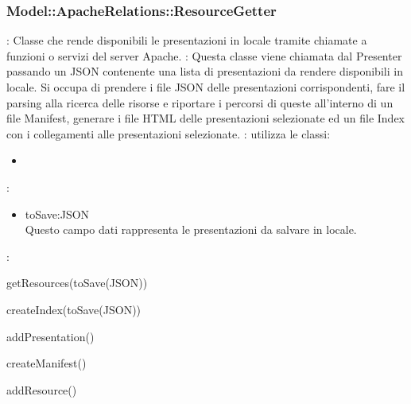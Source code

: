 \subsubsection{Model::ApacheRelations::ResourceGetter}{
	\textbf{\descrizione}: Classe che rende disponibili le presentazioni in locale tramite chiamate a funzioni o servizi del server Apache.
	\textbf{\utilizzo}: Questa classe viene chiamata dal Presenter passando un JSON contenente una lista di presentazioni da rendere disponibili in locale. Si occupa di prendere i file JSON delle presentazioni corrispondenti, fare il parsing alla ricerca delle risorse e riportare i percorsi di queste all'interno di un file Manifest, generare i file HTML delle presentazioni selezionate ed un file Index con i collegamenti alle presentazioni selezionate.
	\textbf{\relazioni}: utilizza le classi:
	\begin{itemize}
	\item
	\end{itemize}
	\textbf{\attributi}:
	\begin{itemize}
		\item toSave:JSON \\Questo campo dati rappresenta le presentazioni da salvare in locale.
	\end{itemize}
	\textbf{\metodi}:
	\begin{\itemize}
	\item getResources(toSave(JSON))
	\item createIndex(toSave(JSON))
	\item addPresentation()
	\item createManifest()
	\item addResource()
	\end{\itemize}
}